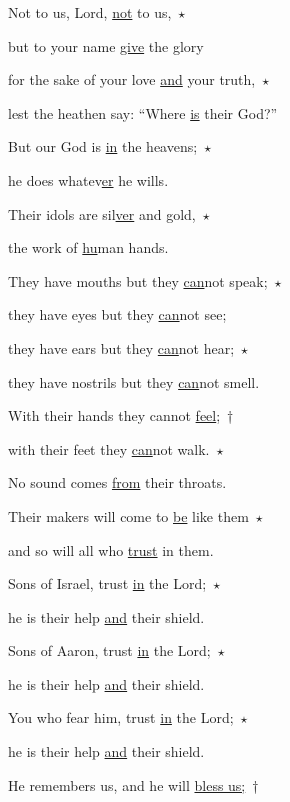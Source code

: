 \noindent Not to us, Lord, \uline{not} to us,~$\star$~\nopagebreak

but to your name \uline{give} the glory

\noindent for the sake of your love \uline{and} your truth,~$\star$~\nopagebreak

lest the heathen say: “Where \uline{is} their God?”



\noindent But our God is \uline{in} the heavens;~$\star$~\nopagebreak

he does whatev\uline{er} he wills.

\noindent Their idols are sil\uline{ver} and gold,~$\star$~\nopagebreak

the work of \uline{hu}man hands.



\noindent They have mouths but they \uline{can}not speak;~$\star$~\nopagebreak

they have eyes but they \uline{can}not see;

\noindent they have ears but they \uline{can}not hear;~$\star$~\nopagebreak

they have nostrils but they \uline{can}not smell.



\noindent With their hands they cannot \uline{feel};~†~\nopagebreak

with their feet they \uline{can}not walk.~$\star$~\nopagebreak

No sound comes \uline{from} their throats.



\noindent Their makers will come to \uline{be} like them~$\star$~\nopagebreak

and so will all who \uline{trust} in them.



\noindent Sons of Israel, trust \uline{in} the Lord;~$\star$~\nopagebreak

he is their help \uline{and} their shield.

\noindent Sons of Aaron, trust \uline{in} the Lord;~$\star$~\nopagebreak

he is their help \uline{and} their shield.



\noindent You who fear him, trust \uline{in} the Lord;~$\star$~\nopagebreak

he is their help \uline{and} their shield.

\noindent He remembers us, and he will \uline{bless us;}~†~\nopagebreak


